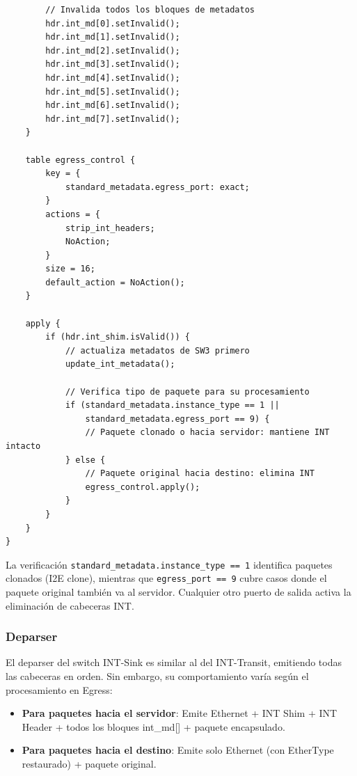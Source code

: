 \begin{lstlisting}
        // Invalida todos los bloques de metadatos
        hdr.int_md[0].setInvalid();
        hdr.int_md[1].setInvalid();
        hdr.int_md[2].setInvalid();
        hdr.int_md[3].setInvalid();
        hdr.int_md[4].setInvalid();
        hdr.int_md[5].setInvalid();
        hdr.int_md[6].setInvalid();
        hdr.int_md[7].setInvalid();
    }

    table egress_control {
        key = {
            standard_metadata.egress_port: exact;
        }
        actions = {
            strip_int_headers;
            NoAction;
        }
        size = 16;
        default_action = NoAction();
    }

    apply {
        if (hdr.int_shim.isValid()) {
            // actualiza metadatos de SW3 primero
            update_int_metadata();

            // Verifica tipo de paquete para su procesamiento
            if (standard_metadata.instance_type == 1 || 
                standard_metadata.egress_port == 9) {
                // Paquete clonado o hacia servidor: mantiene INT intacto
            } else {
                // Paquete original hacia destino: elimina INT
                egress_control.apply();
            }
        }
    }
}
\end{lstlisting}

La verificación \texttt{standard\_metadata.instance\_type == 1} identifica paquetes clonados (I2E clone), mientras que \texttt{egress\_port == 9} cubre casos donde el paquete original también va al servidor. Cualquier otro puerto de salida activa la eliminación de cabeceras INT.

\subsubsection{Deparser}
El deparser del switch INT-Sink es similar al del INT-Transit, emitiendo todas las cabeceras en orden. Sin embargo, su comportamiento varía según el procesamiento en Egress:

\begin{itemize}
    \item \textbf{Para paquetes hacia el servidor}: Emite Ethernet + INT Shim + INT Header + todos los bloques int\_md[] + paquete encapsulado.
    \item \textbf{Para paquetes hacia el destino}: Emite solo Ethernet (con EtherType restaurado) + paquete original.
\end{itemize}

